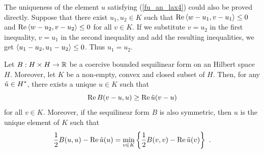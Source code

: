 \begin{rmk}
The uniqueness of the element $u$ satisfying (\ref{fu_an_lax4}) could
also be proved directly.  Suppose that there exist $u_1, u_2 \in K$
such that
$\displaystyle \operatorname{Re} \left\langle{w-u_1} , {v-u_1}\right\rangle \leq 0$
and $\displaystyle \operatorname{Re} \left\langle{w-u_2} , {v-u_2}\right\rangle \leq 0$ for all $v \in K$.
If we substitute $v=u_2$ in the first inequality, $v=u_1$ in the
second inequality and add the resulting inequalities, we get
$\displaystyle \left\langle{u_1-u_2} , {u_1-u_2}\right\rangle \leq 0$.  Thus $u_1=u_2$.
\end{rmk}

\begin{theorem}[Stampacchia] \label{fu_an_stamp}
Let $B:H\times H\rightarrow \mathbb{R}$ be a coercive bounded sequilinear form
on an Hilbert space $H$.  
Moreover, let $K$ be a non-empty, convex and
closed subset of $H$.  Then, for any $\displaystyle \tilde{u} \in H^\ast$, there
exists a unique $u\in K$ such that
\begin{equation} \label{fu_an_lax1}
\operatorname{Re} B(v-u,u) \geq \operatorname{Re} \tilde{u}(v-u)
\end{equation}
for all $v \in K$.  Moreover, if the sequilinear form $B$ is also
symmetric, then $u$ is the unique element of $K$ such that
\begin{equation} \label{fu_an_lax8}
\frac{1}{2}B(u,u) - \operatorname{Re}\tilde{u}(u) = \min_{v\in K} \left\{
\frac{1}{2}B(v,v) - \operatorname{Re}\tilde{u}(v) \right\} \ .
\end{equation}
\end{theorem}


